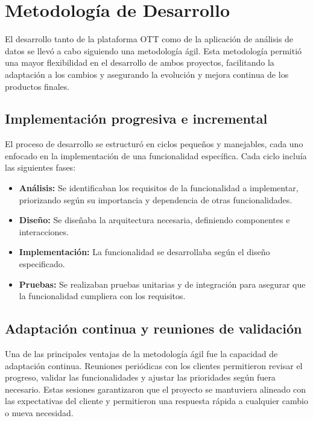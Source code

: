 \section{Metodología de Desarrollo}
\label{sec:metodologia_desarrollo}

El desarrollo tanto de la plataforma OTT como de la aplicación de análisis de datos se llevó a cabo siguiendo 
una metodología ágil. Esta metodología permitió una mayor flexibilidad en el desarrollo de ambos proyectos, 
facilitando la adaptación a los cambios y asegurando la evolución y mejora continua de los productos finales.

\subsection{Implementación progresiva e incremental}
\label{subsec:implementacion_progresiva}

El proceso de desarrollo se estructuró en ciclos pequeños y manejables, cada uno enfocado en la implementación de 
una funcionalidad específica. Cada ciclo incluía las siguientes fases:

\begin{itemize}
    \item \textbf{Análisis:} Se identificaban los requisitos de la funcionalidad a implementar, priorizando según su importancia y dependencia de otras funcionalidades.
    \item \textbf{Diseño:} Se diseñaba la arquitectura necesaria, definiendo componentes e interacciones.
    \item \textbf{Implementación:} La funcionalidad se desarrollaba según el diseño especificado.
    \item \textbf{Pruebas:} Se realizaban pruebas unitarias y de integración para asegurar que la funcionalidad cumpliera con los requisitos.
\end{itemize}

\subsection{Adaptación continua y reuniones de validación}
\label{subsec:adaptacion_reuniones}

Una de las principales ventajas de la metodología ágil fue la capacidad de adaptación continua. Reuniones periódicas 
con los clientes permitieron revisar el progreso, validar las funcionalidades y ajustar las prioridades según fuera 
necesario. Estas sesiones garantizaron que el proyecto se mantuviera alineado con las expectativas del cliente y 
permitieron una respuesta rápida a cualquier cambio o nueva necesidad.

